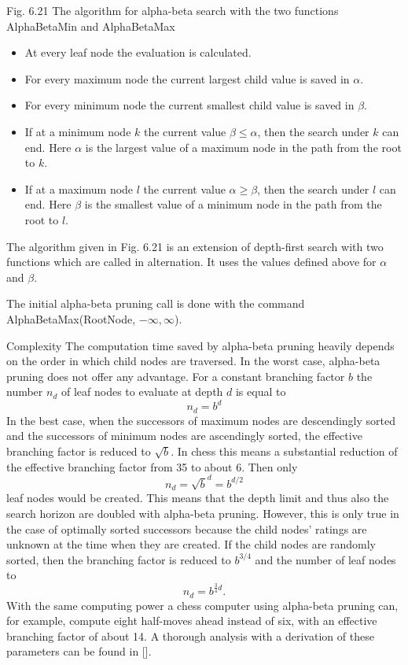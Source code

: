 \documentclass[10pt]{book}
\begin{document}
Fig. 6.21 The algorithm for alpha-beta search with the two functions AlphaBetaMin and AlphaBetaMax

\begin{itemize}
  \item At every leaf node the evaluation is calculated.
  \item For every maximum node the current largest child value is saved in $\alpha$.
  \item For every minimum node the current smallest child value is saved in $\beta$.
  \item If at a minimum node $k$ the current value $\beta \leq \alpha$, then the search under $k$ can end. Here $\alpha$ is the largest value of a maximum node in the path from the root to $k$.
  \item If at a maximum node $l$ the current value $\alpha \geq \beta$, then the search under $l$ can end. Here $\beta$ is the smallest value of a minimum node in the path from the root to $l$.
\end{itemize}
The algorithm given in Fig. 6.21 is an extension of depth-first search with two functions which are called in alternation. It uses the values defined above for $\alpha$ and $\beta$.

The initial alpha-beta pruning call is done with the command\\
AlphaBetaMax(RootNode, $-\infty, \infty$).

Complexity The computation time saved by alpha-beta pruning heavily depends on the order in which child nodes are traversed. In the worst case, alpha-beta pruning does not offer any advantage. For a constant branching factor $b$ the number $n_{d}$ of leaf nodes to evaluate at depth $d$ is equal to
$$
n_{d}=b^{d}
$$
In the best case, when the successors of maximum nodes are descendingly sorted and the successors of minimum nodes are ascendingly sorted, the effective branching factor is reduced to $\sqrt{b}$. In chess this means a substantial reduction of the effective branching factor from 35 to about 6. Then only
$$
n_{d}=\sqrt{b}^{d}=b^{d / 2}
$$
leaf nodes would be created. This means that the depth limit and thus also the search horizon are doubled with alpha-beta pruning. However, this is only true in the case of optimally sorted successors because the child nodes' ratings are unknown at the time when they are created. If the child nodes are randomly sorted, then the branching factor is reduced to $b^{3 / 4}$ and the number of leaf nodes to
$$
n_{d}=b^{\frac{3}{4} d} .
$$
With the same computing power a chess computer using alpha-beta pruning can, for example, compute eight half-moves ahead instead of six, with an effective branching factor of about 14. A thorough analysis with a derivation of these parameters can be found in [\cite{pearl1984heuristics}].
\end{document}
